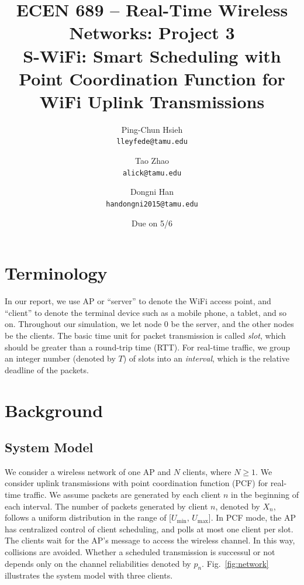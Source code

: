 \documentclass{article}
\begin{document}
\title{\bfseries ECEN 689 -- Real-Time Wireless Networks: Project 3\\
S-WiFi: Smart Scheduling with Point Coordination Function for WiFi Uplink Transmissions}
\date{Due on 5/6}
\author{%
Ping-Chun Hsieh\\
\texttt{lleyfede@tamu.edu}
\and
Tao Zhao\\
\texttt{alick@tamu.edu}
\and
Dongni Han\\
\texttt{handongni2015@tamu.edu}
}
\maketitle

\section*{Terminology}

In our report, we use AP or ``server'' to denote the WiFi access point, and ``client'' to denote the terminal device such as a mobile phone, a tablet, and so on. Throughout our simulation, we let node $0$ be the server, and the other nodes be the clients. The basic time unit for packet transmission is called \emph{slot}, which should be greater than a round-trip time (RTT). For real-time traffic, we group an integer number (denoted by $T$) of slots into an \emph{interval}, which is the relative deadline of the packets.

\section{Background}
\subsection{System Model}
We consider a wireless network of one AP and $N$ clients, where $N\ge1$. We consider uplink transmissions with point coordination function (PCF) for real-time traffic. We assume packets are generated by each client $n$ in the beginning of each interval. The number of packets generated by client $n$, denoted by $X_n$, follows a uniform distribution in the range of [$U_\text{min}$, $U_\text{max}$]. In PCF mode, the AP has centralized control of client scheduling, and polls at most one client per slot. The clients wait for the AP's message to access the wireless channel. In this way, collisions are avoided. Whether a scheduled transmission is successul or not depends only on the channel reliabilities denoted by $p_n$. Fig.~\ref{fig:network} illustrates the system model with three clients.
\end{document}
